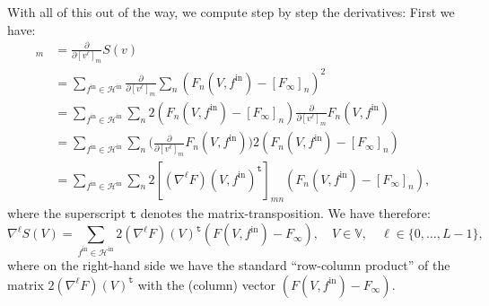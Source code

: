 \documentclass[10pt, a4paper]{article}
\theoremstyle{plain}
\theoremstyle{definition}
\theoremstyle{definition}
\theoremstyle{definition}
\theoremstyle{definition}
\theoremstyle{definition}
\theoremstyle{definition}
\theoremstyle{definition}
\theoremstyle{remark}
\theoremstyle{remark}
\theoremstyle{rudin-style-generic}
\theoremstyle{rudin-style-generic*}
\theoremstyle{rudin-style-theorem}
\newcommand*{\fin}{{f^{\text{in}}}}
\begin{document}
  With all of this out of the way,  we compute step by step the derivatives:
  First we have:  
  \begin{align*}
    [\nabla^\ell S(v)]_m
    &= \frac{\partial}{\partial [v^\ell]_m} S(v) \\
    &= \sum_{\fin\in\mathcal H^{\text{in}}} \frac{\partial}{\partial [v^\ell]_m} \sum_n (F_n(V,\fin) - [F_\infty]_n  )^2 \\
    &= \sum_{\fin\in\mathcal H^{\text{in}}} \sum_n 2(F_n(V,\fin) - [F_\infty]_n)\frac{\partial}{\partial [v^\ell]_m} F_n(V,\fin)\\
    &= \sum_{\fin\in\mathcal H^{\text{in}}} \sum_n \big( \frac{\partial}{\partial [v^\ell]_m} F_n(V,\fin) \big) 2(F_n(V,\fin) - [F_\infty]_n)\\
    &= \sum_{\fin\in\mathcal H^{\text{in}}} \sum_n 2 [(\nabla^\ell F)(V,\fin)^{\mathtt t}]_{mn} (F_n(V,\fin) - [F_\infty]_n)
    ,
  \end{align*}
  where the superscript $\mathtt t$ denotes the matrix-transposition.
  We have therefore:
  \begin{equation}\label{eq:10}
    \nabla^\ell S(V)
    = \sum_{\fin\in\mathcal H^{\text{in}}}  2(\nabla^\ell F)(V)^{\mathtt t}   (F(V,\fin) - F_\infty)  ,
      \quad      V\in\mathbb V,
      \quad \ell\in\{0,\dots,L-1\}
      ,
  \end{equation}
  where on the right-hand side we have the standard ``row-column product'' of the matrix $2(\nabla^\ell F)(V)^{\mathtt t}$
  with the (column) vector $(F(V,\fin) - F_\infty)$.
  
\end{document}
